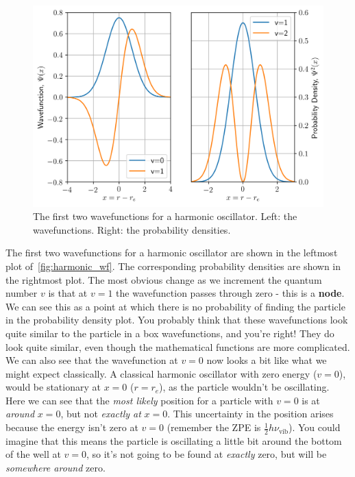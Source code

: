 \documentclass{memoir}[11pt,oneside,a4paper,openany]
\newcommand{\nuv}{\ensuremath{\nu_{\text{vib}}}}
\begin{document}
\begin{figure}
	\centering
	\includegraphics[width=\linewidth]{harmonic_oscillator_wf}
	\caption{The first two wavefunctions for a harmonic oscillator. Left: the wavefunctions. Right: the probability densities.}\label{fig:harmonic_wf}
\end{figure}
The first two wavefunctions for a harmonic oscillator are shown in the leftmost plot of~\autoref{fig:harmonic_wf}. The corresponding probability densities are shown in the rightmost plot. The most obvious change as we increment the quantum number $v$ is that at $v=1$ the wavefunction passes through zero - this is a \textbf{node}. We can see this as a point at which there is no probability of finding the particle in the probability density plot. You probably think that these wavefunctions look quite similar to the particle in a box wavefunctions, and you're right! They do look quite similar, even though the mathematical functions are more complicated. We can also see that the wavefunction at $v=0$ now looks a bit like what we might expect classically. A classical harmonic oscillator with zero energy ($v=0$), would be stationary at $x=0$ ($r = r_e$), as the particle wouldn't be oscillating. Here we can see that the \emph{most likely} position for a particle with $v=0$ is at \emph{around} $x=0$, but not \emph{exactly at} $x=0$. This uncertainty in the position arises because the energy isn't zero at $v=0$ (remember the ZPE is $\frac{1}{2}h\nuv$). You could imagine that this means the particle is oscillating a little bit around the bottom of the well at $v=0$, so it's not going to be found at \emph{exactly} zero, but will be \emph{somewhere around} zero.
\end{document}
